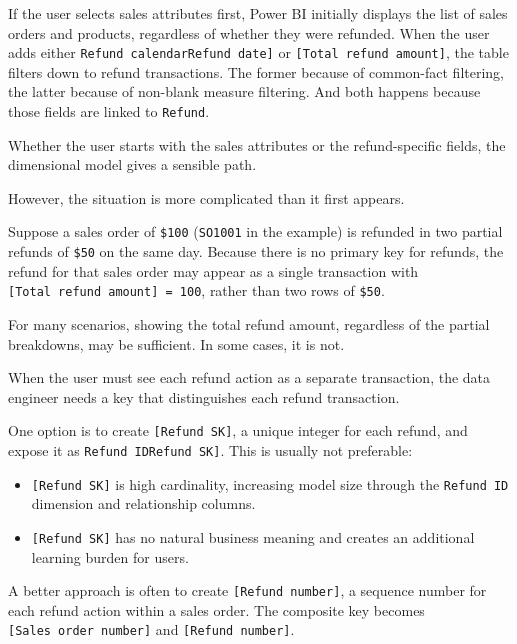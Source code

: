 \documentclass[10pt,openany,10pt]{book}
\providecommand{\tightlist}{%
  \setlength{\itemsep}{0pt}\setlength{\parskip}{0pt}}
\begin{document}
If the user selects sales attributes first, Power BI initially displays
the list of sales orders and products, regardless of whether they were
refunded. When the user adds either
\texttt{\textquotesingle{}Refund\ calendar\textquotesingle{}{[}Refund\ date{]}}
or \texttt{{[}Total\ refund\ amount{]}}, the table filters down to
refund transactions. The former because of common-fact filtering, the
latter because of non-blank measure filtering. And both happens because
those fields are linked to
\texttt{\textquotesingle{}Refund\textquotesingle{}}.

Whether the user starts with the sales attributes or the refund-specific
fields, the dimensional model gives a sensible path.

However, the situation is more complicated than it first appears.

Suppose a sales order of \texttt{\$100} (\texttt{SO1001} in the example)
is refunded in two partial refunds of \texttt{\$50} on the same day.
Because there is no primary key for refunds, the refund for that sales
order may appear as a single transaction with
\texttt{{[}Total\ refund\ amount{]}\ =\ 100}, rather than two rows of
\texttt{\$50}.

For many scenarios, showing the total refund amount, regardless of the
partial breakdowns, may be sufficient. In some cases, it is not.

When the user must see each refund action as a separate transaction, the
data engineer needs a key that distinguishes each refund transaction.

One option is to create \texttt{{[}Refund\ SK{]}}, a unique integer for
each refund, and expose it as
\texttt{\textquotesingle{}Refund\ ID\textquotesingle{}{[}Refund\ SK{]}}.
This is usually not preferable:

\begin{itemize}
\tightlist
\item
  \texttt{{[}Refund\ SK{]}} is high cardinality, increasing model size
  through the \texttt{\textquotesingle{}Refund\ ID\textquotesingle{}}
  dimension and relationship columns.
\item
  \texttt{{[}Refund\ SK{]}} has no natural business meaning and creates
  an additional learning burden for users.
\end{itemize}

A better approach is often to create \texttt{{[}Refund\ number{]}}, a
sequence number for each refund action within a sales order. The
composite key becomes \texttt{{[}Sales\ order\ number{]}} and
\texttt{{[}Refund\ number{]}}.
\end{document}

